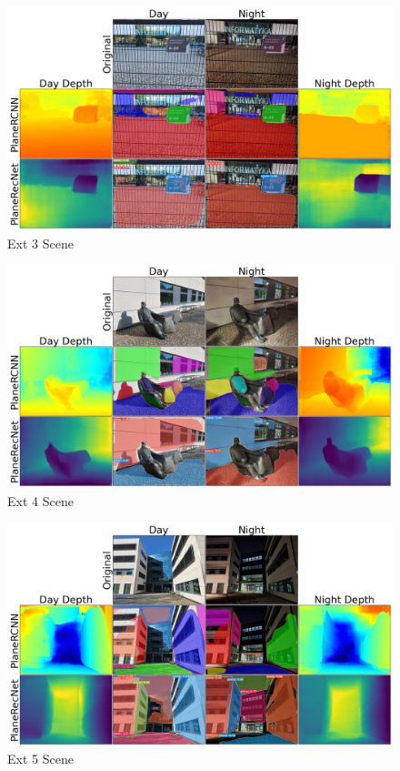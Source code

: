 \begin{figure}[H]
    \centering
    \includegraphics[width=1.0\textwidth]{images/results/Ext_3.png}
    \caption{Ext 3 Scene}
    \label{figure:Ext_3}
\end{figure}

\begin{figure}[H]
    \centering
    \includegraphics[width=1.0\textwidth]{images/results/Ext_4.png}
    \caption{Ext 4 Scene}
    \label{figure:Ext_4}
\end{figure}

\begin{figure}[H]
    \centering
    \includegraphics[width=1.0\textwidth]{images/results/Ext_5.png}
    \caption{Ext 5 Scene}
    \label{figure:Ext_5}
\end{figure}

